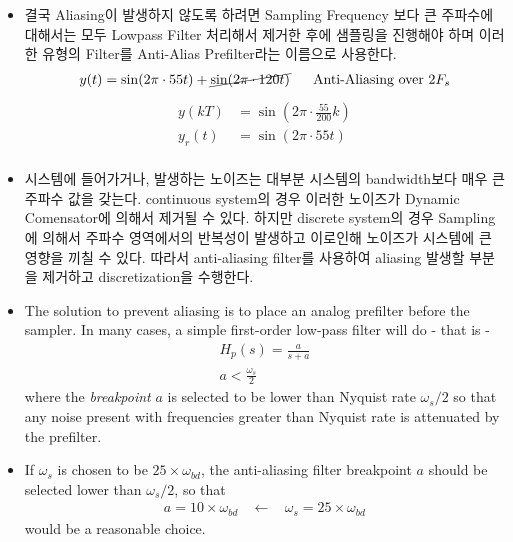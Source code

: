 \begin{itemize}
\begin{itemize}
		\item 결국 Aliasing이 발생하지 않도록 하려면 Sampling Frequency 보다 큰 주파수에 대해서는 모두 Lowpass Filter 처리해서 제거한 후에 샘플링을 진행해야 하며 이러한 유형의 Filter를 Anti-Alias Prefilter라는 이름으로 사용한다.
		\begin{align*}
				y(t) = \sin(2 \pi \cdot 55t) +\cancel{\sin(2\pi \cdot 120t)} ~~~~~ \text{Anti-Aliasing over $2 F_s$}
		\end{align*}	
		\begin{align*}
			y(kT) &=   \sin(2 \pi \cdot \frac{55}{200}  k) \\
			y_r(t)&=    \sin(2 \pi \cdot 55t) \\
		\end{align*}

		\item 시스템에 들어가거나, 발생하는 노이즈는 대부분 시스템의 bandwidth보다 매우 큰 주파수 값을 갖는다. continuous system의 경우 이러한 노이즈가 Dynamic Comensator에 의해서 제거될 수 있다. 하지만 discrete system의 경우 Sampling에 의해서 주파수 영역에서의 반복성이 발생하고 이로인해 노이즈가 시스템에 큰 영향을 끼칠 수 있다. 따라서 anti-aliasing filter를 사용하여 aliasing 발생할 부분을 제거하고 discretization을 수행한다.

		\item The solution to prevent aliasing is to place an analog prefilter before the sampler. In many cases, a simple first-order low-pass filter will do - that is - 
		\begin{align*}
			H_p(s) = \frac{a}{s+a}\\
			a < \frac{\omega_s }{2}
		\end{align*}
		where the \emph{breakpoint} $a$ is selected to be lower than Nyquist rate $\omega_s/2$ so that any noise present with frequencies greater than Nyquist rate is attenuated by the prefilter. 

		\item If $\omega_s$ is chosen to be $25 \times \omega_{bd}$, the anti-aliasing filter breakpoint $a$ should be selected lower than $\omega_s/2$, so that 
		\begin{align*}
			a = 10 \times \omega_{bd} ~~~~\leftarrow~~~~ \omega_s = 25 \times \omega_{bd} 
		\end{align*}
		would be a reasonable choice. 
	\end{itemize}
\end{itemize}
%
%
\newpage
%
